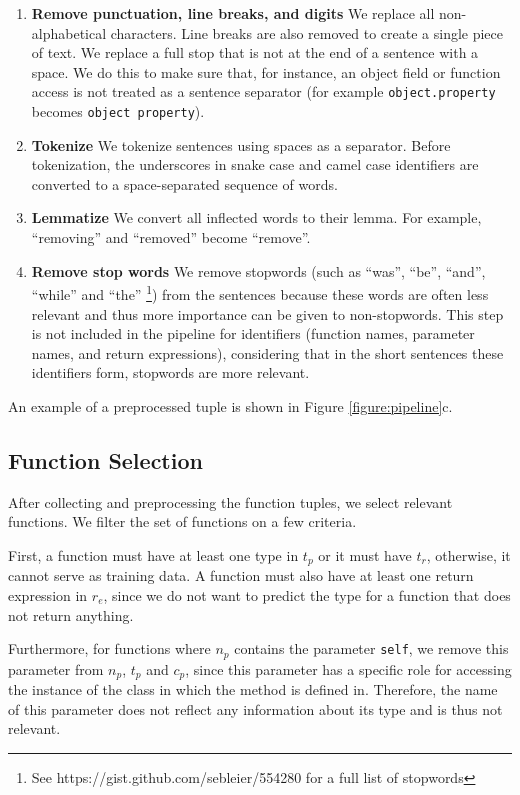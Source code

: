 \begin{enumerate}
    \item \textbf{Remove punctuation, line breaks, and digits} We replace all non-alphabetical characters. Line breaks are also removed to create a single piece of text. We replace a full stop that is not at the end of a sentence with a space. We do this to make sure that, for instance, an object field or function access is not treated as a sentence separator (for example \texttt{object.property} becomes \texttt{object property}).
    \item \textbf{Tokenize} We tokenize sentences using spaces as a separator. Before tokenization, the underscores in snake case and camel case identifiers are converted to a space-separated sequence of words. 
    \item \textbf{Lemmatize} We convert all inflected words to their lemma. For example, ``removing'' and ``removed'' become ``remove''.
    \item \textbf{Remove stop words} We remove stopwords (such as ``was'', ``be'', ``and'', ``while'' and ``the'' \footnote{See https://gist.github.com/sebleier/554280 for a full list of stopwords}) from the sentences because these words are often less relevant and thus more importance can be given to non-stopwords. This step is not included in the pipeline for identifiers (function names, parameter names, and return expressions), considering that in the short sentences these identifiers form, stopwords are more relevant.
\end{enumerate}

An example of a preprocessed tuple is shown in Figure \ref{figure:pipeline}c.

\subsection{Function Selection} \label{method:selection}
After collecting and preprocessing the function tuples, we select relevant functions. We filter the set of functions on a few criteria.

First, a function must have at least one type in $t_p$ or it must have $t_r$, otherwise, it cannot serve as training data. A function must also have at least one return expression in $r_e$, since we do not want to predict the type for a function that does not return anything.

Furthermore, for functions where $n_p$ contains the parameter \texttt{self}, we remove this parameter from $n_p$, $t_p$ and $c_p$, since this parameter has a specific role for accessing the instance of the class in which the method is defined in. Therefore, the name of this parameter does not reflect any information about its type and is thus not relevant.

